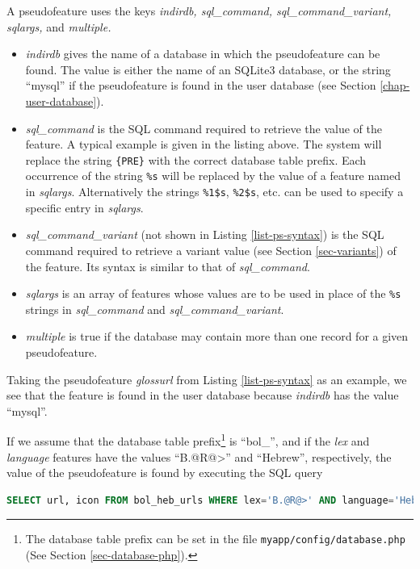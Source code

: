 \documentclass[11pt,oneside,a4paper]{memoir}
\begin{document}
A pseudofeature uses the keys \emph{indirdb, sql\_command, sql\_command\_variant, sqlargs,} and \emph{multiple.}

\begin{itemize}
\item \emph{indirdb} gives the name of a database in which the pseudofeature can be found. The value
  is either the name of an SQLite3 database, or the string ``mysql'' if the
  pseudofeature is found in the user database (see Section
  \ref{chap-user-database}).
\item \emph{sql\_command} is the SQL command required to retrieve the value of the feature. A
  typical example is given in the listing above. The system will replace the string \texttt{\{PRE\}}
  with the correct database table prefix. Each occurrence of the string \texttt{\%s} will be
  replaced by the value of a feature named in \emph{sqlargs}. Alternatively the strings
  \texttt{\%1\$s}, \texttt{\%2\$s}, etc. can be used to specify a specific entry in \emph{sqlargs}.
\item \emph{sql\_command\_variant} (not shown in Listing \ref{list-ps-syntax}) is the SQL command
  required to retrieve a variant value (see Section \ref{sec-variants}) of the feature. Its syntax is
  similar to that of \emph{sql\_command}.
\item \emph{sqlargs} is an array of features whose values are to be used in place of the
  \texttt{\%s} strings in \emph{sql\_command} and \emph{sql\_command\_variant}.
\item \emph{multiple} is true if the database may contain more than one record for a given pseudofeature.
\end{itemize}

Taking the pseudofeature \emph{glossurl} from Listing \ref{list-ps-syntax} as an example, we see that
the feature is found in the user database because \emph{indirdb} has the value ``mysql''.

If we assume that the database table prefix\footnote{The database table prefix can be set in the
  file \texttt{myapp/config/database.php} (See Section \ref{sec-database-php}).} is ``bol\_'', and
if the \emph{lex} and \emph{language} features have the values ``B.@R@>'' and ``Hebrew'', respectively,
the value of the pseudofeature is found by executing the SQL query

\begin{lstlisting}[language=SQL]
SELECT url, icon FROM bol_heb_urls WHERE lex='B.@R@>' AND language='Hebrew'
\end{lstlisting}
\end{document}

